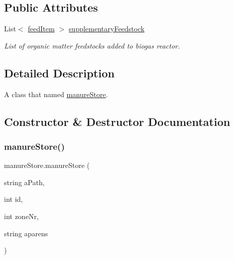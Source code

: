 \subsection*{Public Attributes}
\begin{DoxyCompactItemize}
\item 
\mbox{\label{classmanure_store_a850d2cd27fa7400a7ab9fcda1272f79f}} 
List$<$ \mbox{\hyperlink{classfeed_item}{feed\+Item}} $>$ \mbox{\hyperlink{classmanure_store_a850d2cd27fa7400a7ab9fcda1272f79f}{supplementary\+Feedstock}}
\begin{DoxyCompactList}\small\item\em List of organic matter feedstocks added to biogas reactor. \end{DoxyCompactList}\end{DoxyCompactItemize}


\subsection{Detailed Description}
A class that named \mbox{\hyperlink{classmanure_store}{manure\+Store}}. 

\subsection{Constructor \& Destructor Documentation}
\mbox{\label{classmanure_store_ad428129a6d888e64fbfaf67d821f7311}} 
\subsubsection{\texorpdfstring{manureStore()}{manureStore()}\hspace{0.1cm}{\footnotesize\ttfamily [1/2]}}
{\footnotesize\ttfamily manure\+Store.\+manure\+Store (\begin{DoxyParamCaption}\item[{string}]{a\+Path,  }\item[{int}]{id,  }\item[{int}]{zone\+Nr,  }\item[{string}]{aparens }\end{DoxyParamCaption})\hspace{0.3cm}{\ttfamily [inline]}}



